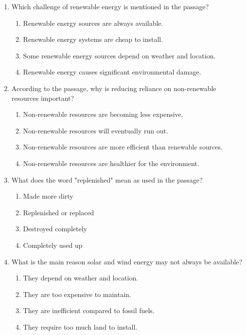 \documentclass[12pt]{article}
\begin{document}
\begin{enumerate}
    \item Which challenge of renewable energy is mentioned in the passage?
    \begin{enumerate}[label=\Alph*.]
        \item Renewable energy sources are always available.
        \item Renewable energy systems are cheap to install.
        \item Some renewable energy sources depend on weather and location.
        \item Renewable energy causes significant environmental damage.
    \end{enumerate}
    \vspace{0.5cm}

    \item According to the passage, why is reducing reliance on non-renewable resources important?
    \begin{enumerate}[label=\Alph*.]
        \item Non-renewable resources are becoming less expensive.
        \item Non-renewable resources will eventually run out.
        \item Non-renewable resources are more efficient than renewable sources.
        \item Non-renewable resources are healthier for the environment.
    \end{enumerate}
    \vspace{0.5cm}

    \item What does the word "replenished" mean as used in the passage?
    \begin{enumerate}[label=\Alph*.]
        \item Made more dirty
        \item Replenished or replaced
        \item Destroyed completely
        \item Completely used up
    \end{enumerate}
    \vspace{0.5cm}

    \item What is the main reason solar and wind energy may not always be available?
    \begin{enumerate}[label=\Alph*.]
        \item They depend on weather and location.
        \item They are too expensive to maintain.
        \item They are inefficient compared to fossil fuels.
        \item They require too much land to install.
    \end{enumerate}
    \vspace{0.5cm}


\end{enumerate}
\end{document}
